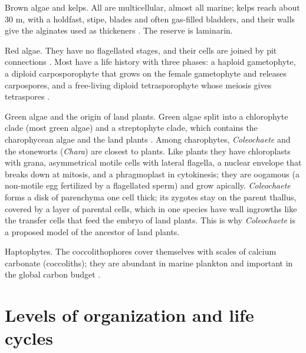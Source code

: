 Brown algae and kelps. All are multicellular,
almost all marine; kelps reach about 30 m,
with a holdfast, stipe, blades and often
gas-filled bladders, and their walls give the
alginates used as thickeners \cite[Chapter
15]{evert2013raven}. The reserve is
laminarin.

Red algae. They have no flagellated stages,
and their cells are joined by pit connections
\cite[Chapter 4]{lee2008phycology}. Most have
a life history with three phases: a haploid
gametophyte, a diploid carposporophyte that
grows on the female gametophyte and releases
carpospores, and a free-living diploid
tetrasporophyte whose meiosis gives
tetraspores \cite[Chapter
15]{evert2013raven}.

Green algae and the origin of land plants.
Green algae split into a chlorophyte clade
(most green algae) and a streptophyte clade,
which contains the charophycean algae and the
land plants \cite[Chapters 15 and
16]{evert2013raven}. Among charophytes,
\emph{Coleochaete} and the stoneworts
(\emph{Chara}) are closest to plants. Like
plants they have chloroplasts with grana,
asymmetrical motile cells with lateral
flagella, a nuclear envelope that breaks down
at mitosis, and a phragmoplast in
cytokinesis; they are oogamous (a non-motile
egg fertilized by a flagellated sperm) and
grow apically. \emph{Coleochaete} forms a
disk of parenchyma one cell thick; its
zygotes stay on the parent thallus, covered
by a layer of parental cells, which in one
species have wall ingrowths like the transfer
cells that feed the embryo of land plants.
This is why
\emph{Coleochaete} is a proposed model of the
ancestor of land plants.

Haptophytes. The coccolithophores cover
themselves with scales of calcium carbonate
(coccoliths); they are abundant in marine
plankton and important in the global carbon
budget \cite[Chapter 25]{willey2008prescott}.

\section{Levels of organization and life
cycles}
\label{section-organization}

